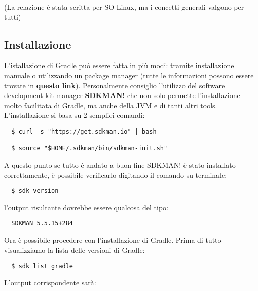 (La relazione è stata scritta per SO Linux, ma i concetti generali valgono per tutti)
\subsection{Installazione}
L'istallazione di Gradle può essere fatta in più modi: tramite installazione manuale o utilizzando un package manager (tutte le informazioni possono essere trovate in \textbf{\href{https://gradle.org/install/}{questo link}}). Personalmente consiglio l'utilizzo del software development kit manager \textbf{\href{http://sdkman.io/}{SDKMAN!}} che non solo permette l'installazione molto facilitata di Gradle, ma anche della JVM e di tanti altri tools. L'installazione si basa su 2 semplici comandi:
\begin{verbatim}
  $ curl -s "https://get.sdkman.io" | bash
  
  $ source "$HOME/.sdkman/bin/sdkman-init.sh" \end{verbatim}
A questo punto se tutto è andato a buon fine SDKMAN! è stato installato correttamente, è possibile verificarlo digitando il comando su terminale:
\begin{verbatim}
  $ sdk version \end{verbatim}
l'output risultante dovrebbe essere qualcosa del tipo:
\begin{verbatim}
  SDKMAN 5.5.15+284 \end{verbatim}
Ora è possibile procedere con l'installazione di Gradle. Prima di tutto visualizziamo la lista delle versioni di Gradle:
\begin{verbatim}
  $ sdk list gradle \end{verbatim}
L'output corrispondente sarà:
